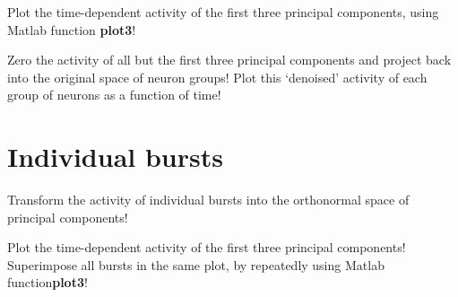 \documentclass[a4paper,12pt]{article}
\begin{document}
Plot the time-dependent activity of the first three principal components, using Matlab function {\bf plot3}! 

Zero the activity of all but the first three principal components and project back into the original space of neuron groups!  Plot this `denoised' activity of each group of neurons as a function of time!

\section{Individual bursts}

Transform the activity of individual bursts into the orthonormal space of principal components!

Plot the time-dependent activity of the first three principal components!  Superimpose all bursts in the same plot, by repeatedly using Matlab function{\bf plot3}! 
\end{document}
